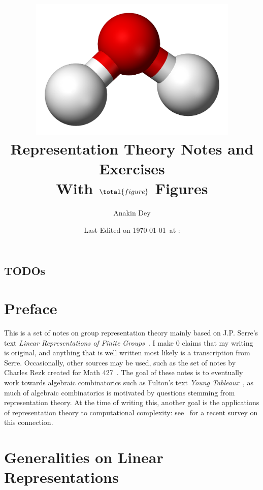 \documentclass[letterpaper, 11pt, oneside]{book}
\title{\vspace{-100pt} \includegraphics[width=0.75\textwidth]{figs/water.png} \\ {\Huge Representation Theory Notes and Exercises} \\ {\small With $\total{figure}$ Figures}}
\author{\Large Anakin Dey}
\date{\small Last Edited on \today\ at \DTMfetchhour{now}:\DTMfetchminute{now}}
\newcommand{\CoverName}{Cover}
\begin{document}
\frontmatter
\renewcommand{\thepage}{\CoverName}
\maketitle


\section*{TODOs}





\tableofcontents
\clearpage


\listoftheorems[ignoreall, show={defn}, title={List of Definitions}]

\listoftheorems[ignoreall, show={ex}, title={List of Examples and Counterexamples}]

\chapter*{Preface}

This is a set of notes on group representation theory mainly based on J.P. Serre's text \emph{Linear Representations of Finite Groups}~\cite{book:SerreLinReps}.
I make $0$ claims that my writing is original, and anything that is well written most likely is a transcription from Serre.
Occasionally, other sources may be used, such as the set of notes by Charles Rezk created for Math 427~\cite{note:rezk_reps}.
The goal of these notes is to eventually work towards algebraic combinatorics such as Fulton's text \emph{Young Tableaux}~\cite{book:FultonTableaux}, as much of algebraic combinatorics is motivated by questions stemming from representation theory.
At the time of writing this, another goal is the applications of representation theory to computational complexity: see~\cite{misc:PanovaComputational} for a recent survey on this connection.

\mainmatter

\chapter{Generalities on Linear Representations}
\end{document}
